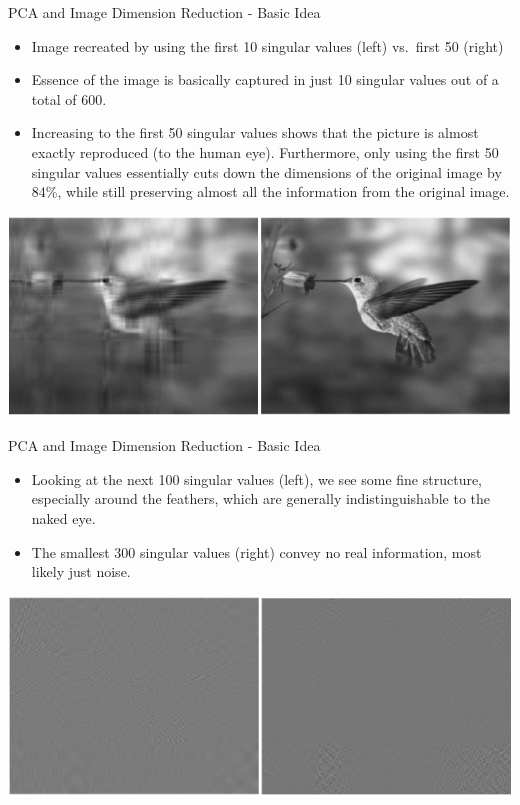 \documentclass[
  ignorenonframetext,
]{beamer}
\providecommand{\tightlist}{%
  \setlength{\itemsep}{0pt}\setlength{\parskip}{0pt}}
\begin{document}
\begin{frame}{PCA and Image Dimension Reduction - Basic Idea}
\protect\hypertarget{pca-and-image-dimension-reduction---basic-idea-2}{}
\begin{itemize}
\tightlist
\item
  Image recreated by using the first 10 singular values (left) vs.~first
  50 (right)
\item
  Essence of the image is basically captured in just 10 singular values
  out of a total of 600.
\item
  Increasing to the first 50 singular values shows that the picture is
  almost exactly reproduced (to the human eye). Furthermore, only using
  the first 50 singular values essentially cuts down the dimensions of
  the original image by 84\%, while still preserving almost all the
  information from the original image.
\end{itemize}

\begin{center}\includegraphics[width=0.7\linewidth]{images/fig2c} \end{center}
\end{frame}

\begin{frame}{PCA and Image Dimension Reduction - Basic Idea}
\protect\hypertarget{pca-and-image-dimension-reduction---basic-idea-3}{}
\begin{itemize}
\tightlist
\item
  Looking at the next 100 singular values (left), we see some fine
  structure, especially around the feathers, which are generally
  indistinguishable to the naked eye.
\item
  The smallest 300 singular values (right) convey no real information,
  most likely just noise.
\end{itemize}

\begin{center}\includegraphics[width=0.7\linewidth]{images/fig2d} \end{center}
\end{frame}
\end{document}
